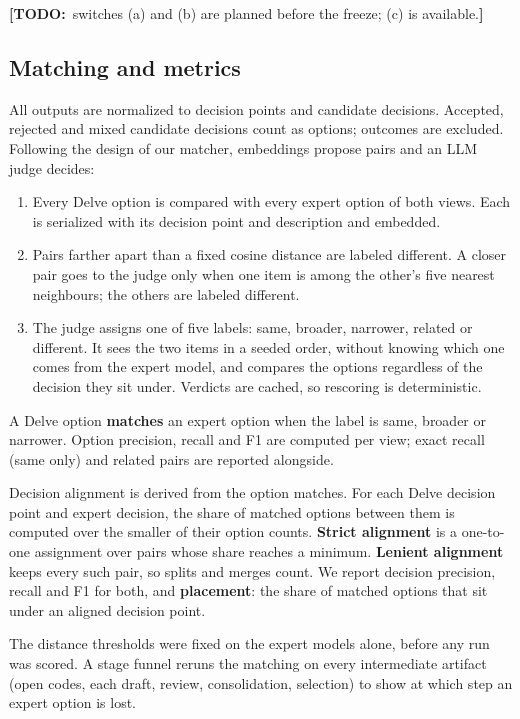 \documentclass[conference]{IEEEtran}
\providecommand{\tightlist}{\setlength{\itemsep}{0pt}\setlength{\parskip}{0pt}}
\newcommand{\todo}[1]{{\color{red}\textbf{[TODO:}~#1\textbf{]}}}
\begin{document}
\todo{switches (a) and (b) are planned before the freeze; (c) is available.}

\subsection{Matching and metrics}

All outputs are normalized to decision points and candidate decisions. Accepted, rejected and mixed candidate decisions count as options; outcomes are excluded. Following the design of our matcher, embeddings propose pairs and an LLM judge decides:

\begin{enumerate}
\def\labelenumi{\arabic{enumi}.}
\tightlist
\item
  Every Delve option is compared with every expert option of both views. Each is serialized with its decision point and description and embedded.
\item
  Pairs farther apart than a fixed cosine distance are labeled different. A closer pair goes to the judge only when one item is among the other's five nearest neighbours; the others are labeled different.
\item
  The judge assigns one of five labels: same, broader, narrower, related or different. It sees the two items in a seeded order, without knowing which one comes from the expert model, and compares the options regardless of the decision they sit under. Verdicts are cached, so rescoring is deterministic.
\end{enumerate}

A Delve option \textbf{matches} an expert option when the label is same, broader or narrower. Option precision, recall and F1 are computed per view; exact recall (same only) and related pairs are reported alongside.

Decision alignment is derived from the option matches. For each Delve decision point and expert decision, the share of matched options between them is computed over the smaller of their option counts. \textbf{Strict alignment} is a one-to-one assignment over pairs whose share reaches a minimum. \textbf{Lenient alignment} keeps every such pair, so splits and merges count. We report decision precision, recall and F1 for both, and \textbf{placement}: the share of matched options that sit under an aligned decision point.

The distance thresholds were fixed on the expert models alone, before any run was scored. A stage funnel reruns the matching on every intermediate artifact (open codes, each draft, review, consolidation, selection) to show at which step an expert option is lost.
\end{document}
